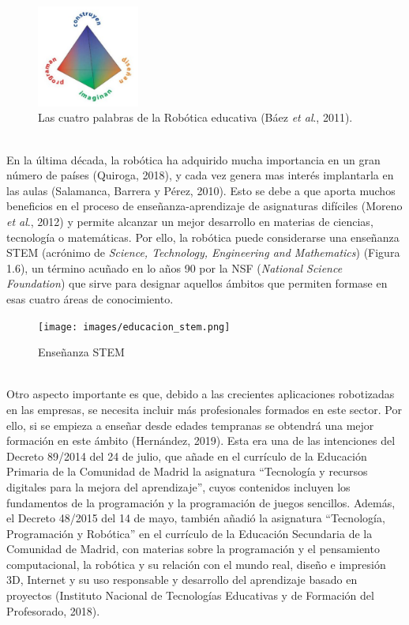 \documentclass{report}
\begin{document}
\\
\begin{figure}[h!]
  \centering
    \includegraphics[width=0.3\textwidth]{images/metodologia.png}
  \caption{Las cuatro palabras de la Robótica educativa (Báez \textit{et al}., 2011).}
  \label{Metodologia}
\end{figure}
\\
En la última década, la robótica ha adquirido mucha importancia en un gran número de países (Quiroga, 2018), y cada vez genera mas interés implantarla en las aulas (Salamanca, Barrera y Pérez, 2010). Esto se debe a que aporta muchos beneficios en el proceso de enseñanza-aprendizaje de asignaturas difíciles (Moreno \textit{et al}., 2012) y permite alcanzar un mejor desarrollo en materias de ciencias, tecnología o matemáticas. Por ello, la robótica puede considerarse una enseñanza STEM (acrónimo de \textit{Science, Technology, Engineering and Mathematics}) (Figura 1.6), un término acuñado en lo años 90 por la NSF (\textit{National Science Foundation}) que sirve para designar aquellos ámbitos que permiten formase en esas cuatro áreas de conocimiento.
\\
\begin{figure}[h!]
  \centering
    \texttt{[image: images/educacion\_stem.png]}
  \caption{Enseñanza STEM}
  \label{Enseñanza STEM}
\end{figure}
\\
Otro aspecto importante es que, debido a las crecientes aplicaciones robotizadas en las empresas, se necesita incluir más profesionales formados en este sector. Por ello, si se empieza a enseñar desde edades tempranas se obtendrá una mejor formación en este ámbito (Hernández, 2019). Esta era una de las intenciones del Decreto 89/2014 del 24 de julio, que añade en el currículo de la Educación Primaria de la Comunidad de Madrid la asignatura “Tecnología y recursos digitales para la mejora del aprendizaje”, cuyos contenidos incluyen los fundamentos de la programación y la programación de juegos sencillos. Además, el Decreto 48/2015 del 14 de mayo, también añadió la asignatura “Tecnología, Programación y Robótica” en el currículo de la Educación Secundaria de la Comunidad de Madrid, con materias sobre la programación y el pensamiento computacional, la robótica y su relación con el mundo real, diseño e impresión 3D,  Internet y su uso responsable y desarrollo del aprendizaje basado en proyectos (Instituto Nacional de Tecnologías Educativas y de Formación del Profesorado, 2018).
\end{document}
